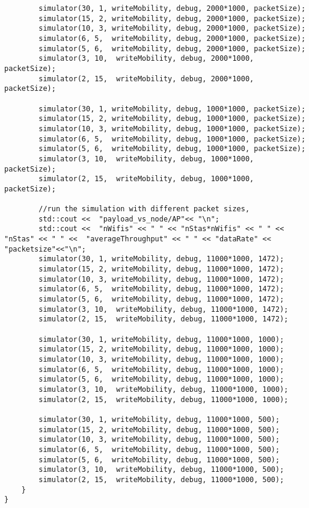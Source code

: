 \begin{lstlisting}
		simulator(30, 1, writeMobility, debug, 2000*1000, packetSize);
		simulator(15, 2, writeMobility, debug, 2000*1000, packetSize);
		simulator(10, 3, writeMobility, debug, 2000*1000, packetSize);
		simulator(6, 5,  writeMobility, debug, 2000*1000, packetSize);
		simulator(5, 6,  writeMobility, debug, 2000*1000, packetSize);
		simulator(3, 10,  writeMobility, debug, 2000*1000, packetSize);
		simulator(2, 15,  writeMobility, debug, 2000*1000, packetSize);
		
		simulator(30, 1, writeMobility, debug, 1000*1000, packetSize);
		simulator(15, 2, writeMobility, debug, 1000*1000, packetSize);
		simulator(10, 3, writeMobility, debug, 1000*1000, packetSize);
		simulator(6, 5,  writeMobility, debug, 1000*1000, packetSize);
		simulator(5, 6,  writeMobility, debug, 1000*1000, packetSize);
		simulator(3, 10,  writeMobility, debug, 1000*1000, packetSize);
		simulator(2, 15,  writeMobility, debug, 1000*1000, packetSize);
		
		//run the simulation with different packet sizes,
		std::cout <<  "payload_vs_node/AP"<< "\n";
		std::cout <<  "nWifis" << " " << "nStas*nWifis" << " " << "nStas" << " " <<  "averageThroughput" << " " << "dataRate" << "packetsize"<<"\n";
		simulator(30, 1, writeMobility, debug, 11000*1000, 1472);
		simulator(15, 2, writeMobility, debug, 11000*1000, 1472);
		simulator(10, 3, writeMobility, debug, 11000*1000, 1472);
		simulator(6, 5,  writeMobility, debug, 11000*1000, 1472);
		simulator(5, 6,  writeMobility, debug, 11000*1000, 1472);
		simulator(3, 10,  writeMobility, debug, 11000*1000, 1472);
		simulator(2, 15,  writeMobility, debug, 11000*1000, 1472);
		
		simulator(30, 1, writeMobility, debug, 11000*1000, 1000);
		simulator(15, 2, writeMobility, debug, 11000*1000, 1000);
		simulator(10, 3, writeMobility, debug, 11000*1000, 1000);
		simulator(6, 5,  writeMobility, debug, 11000*1000, 1000);
		simulator(5, 6,  writeMobility, debug, 11000*1000, 1000);
		simulator(3, 10,  writeMobility, debug, 11000*1000, 1000);
		simulator(2, 15,  writeMobility, debug, 11000*1000, 1000);
		
		simulator(30, 1, writeMobility, debug, 11000*1000, 500);
		simulator(15, 2, writeMobility, debug, 11000*1000, 500);
		simulator(10, 3, writeMobility, debug, 11000*1000, 500);
		simulator(6, 5,  writeMobility, debug, 11000*1000, 500);
		simulator(5, 6,  writeMobility, debug, 11000*1000, 500);
		simulator(3, 10,  writeMobility, debug, 11000*1000, 500);
		simulator(2, 15,  writeMobility, debug, 11000*1000, 500);
	}
}



\end{lstlisting}




